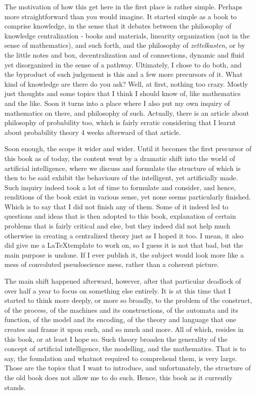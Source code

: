 The motivation of how this get here in the first place is rather simple. Perhaps more straightforward than you would imagine. It started simple as a book to comprise knowledge, in the sense that it debates between the philosophy of knowledge centralization - books and materials, linearity organization (not in the sense of mathematics), and such forth, and the philosophy of \textit{zettelkasten}, or by the little notes and box, decentralization and of connections, dynamic and fluid yet disorganized in the sense of a pathway. Ultimately, I chose to do both, and the byproduct of such judgement is this and a few more precursors of it. What kind of knowledge are there do you ask? Well, at first, nothing too crazy. Mostly just thoughts and some topics that I think I should know of, like mathematics and the like. Soon it turns into a place where I also put my own inquiry of mathematics on there, and philosophy of such. Actually, there is an article about philosophy of probability too, which is fairly erratic considering that I learnt about probability theory 4 weeks afterward of that article. 

Soon enough, the scope it wider and wider. Until it becomes the first precursor of this book as of today, the content went by a dramatic shift into the world of artificial intelligence, where we discuss and formulate the structure of which is then to be said exhibit the behaviours of the intelligent, yet artificially made. Such inquiry indeed took a lot of time to formulate and consider, and hence, renditions of the book exist in various sense, yet none seems particularly finished. Which is to say that I did not finish any of them. Some of it indeed led to questions and ideas that is then adopted to this book, explanation of certain problems that is fairly critical and else, but they indeed did not help much otherwise in creating a centralized theory just as I hoped it too. I mean, it also did give me a \LaTeX template to work on, so I guess it is not that bad, but the main purpose is undone. If I ever publish it, the subject would look more like a mess of convoluted pseudoscience mess, rather than a coherent picture. 

The main shift happened afterward, however, after that particular deadlock of over half a year to focus on something else entirely. It is at this time that I started to think more deeply, or more so broadly, to the problem of the construct, of the process, of the machines and its constructions, of the automata and its function, of the model and its encoding, of the theory and language that one creates and frame it upon such, and so much and more. All of which, resides in this book, or at least I hope so. Such theory broaden the generality of the concept of artificial intelligence, the modelling, and the mathematics. That is to say, the foundation and whatnot required to comprehend them, is very large. Those are the topics that I want to introduce, and unfortunately, the structure of the old book does not allow me to do such. Hence, this book as it currently stands. 

